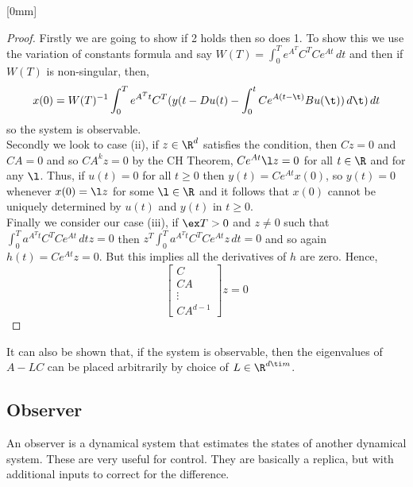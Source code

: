 
[0mm]
\begin{proof}
  Firstly we are going to show if 2 holds then so does 1. To show this we use the variation of constants formula and say $W(T) = \int_0^T e^{A^T}C^TCe^{At}\,dt$ and then if $W(T)$ is non-singular, then,
  $$ x(0) = W(T)^{-1}\int_0^T e^{A^Tt}C^T(y(t - Du(t) - \int_0^t Ce^{A(t-\t)}Bu(\t))\,d\t)\,dt $$
  so the system is observable.\\

  Secondly we look to case (ii), if $z \in \R^d$ satisfies the condition, then $Cz = 0$ and $CA = 0$ and so $CA^kz = 0$ by the CH Theorem, $Ce^{At}\l z = 0$ for all $t \in \R$ and for any $\l$. Thus, if $u(t) = 0$ for all $t \ge 0$ then $y(t) = Ce^{At} x(0)$, so $y(t) = 0$ whenever $x(0) = \l z$ for some $\l \in \R$ and it follows that $x(0)$ cannot be uniquely determined by $u(t)$ and $y(t)$ in $t \ge 0$.\\

  Finally we consider our case (iii), if $\ex T > 0$ and $z \ne 0$ such that $\int_0^T a^{A^Tt}C^TCe^{At}\,dtz = 0$ then $z^T\int_0^T a^{A^Tt}C^TCe^{At}z\,dt = 0$ and so again $h(t) = Ce^{At}z = 0$. But this implies all the derivatives of $h$ are zero. Hence,
  $$ \begin{bmatrix}
    C \\ CA \\ \vdots \\ CA^{d-1}
  \end{bmatrix}z = 0 $$
\end{proof}

\begin{remark}
   It can also be shown that, if the system is observable, then the eigenvalues of $A - LC$ can be placed arbitrarily by choice of $L \in \R^{d \ti m}$.
\end{remark}

\subsection{Observer}
An observer is a dynamical system that estimates the states of another dynamical system. These are very useful for control. They are basically a replica, but with additional inputs to correct for the difference.\\

